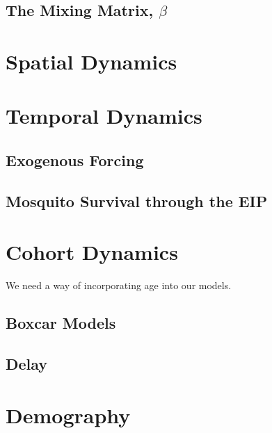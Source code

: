 \documentclass[
]{book}
\begin{document}
\hypertarget{the-mixing-matrix-beta}{%
\section{\texorpdfstring{The Mixing Matrix, \(\beta\)}{The Mixing Matrix, \textbackslash beta}}\label{the-mixing-matrix-beta}}

\hypertarget{spatial-dynamics}{%
\chapter{Spatial Dynamics}\label{spatial-dynamics}}

\hypertarget{temporal-dynamics}{%
\chapter{Temporal Dynamics}\label{temporal-dynamics}}

\hypertarget{exogenous-forcing-2}{%
\section{Exogenous Forcing}\label{exogenous-forcing-2}}

\hypertarget{mosquito-survival-through-the-eip}{%
\section{Mosquito Survival through the EIP}\label{mosquito-survival-through-the-eip}}

\hypertarget{cohort-dynamics}{%
\chapter{Cohort Dynamics}\label{cohort-dynamics}}

We need a way of incorporating age into our models.

\hypertarget{boxcar-models}{%
\section{Boxcar Models}\label{boxcar-models}}

\hypertarget{delay}{%
\section{Delay}\label{delay}}

\hypertarget{demography}{%
\chapter{Demography}\label{demography}}
\end{document}

